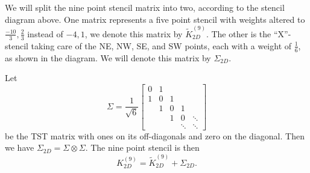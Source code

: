 We will split the nine point stencil matrix into two, according to the stencil diagram above.
One matrix represents a five point stencil with weights altered to $\frac{-10}{3}, \frac23$ instead of $-4, 1$, we denote this matrix by $\tilde{K}_{2D}^{(9)}$.
The other is the ``X''-stencil taking care of the NE, NW, SE, and SW points, each with a weight of $\frac16$, as shown in the diagram.
We will denote this matrix by $\Sigma_{2D}$.

Let
\begin{equation}
  \Sigma =
  \frac{1}{\sqrt{6}}
  \begin{bmatrix}
    0 & 1  \\
    1 & 0 & 1 \\
      & 1 & 0 & 1 \\
      &   & 1 & 0 & \ddots\\
      &   &   & \ddots  & \ddots
  \end{bmatrix}
\end{equation}
be the TST matrix with ones on its off-diagonals and zero on the diagonal.
Then we have $\Sigma_{2D} = \Sigma \otimes \Sigma$.
The nine point stencil is then
\begin{equation}
  K_{2D}^{(9)} = \tilde{K}_{2D}^{(9)} + \Sigma_{2D}.
\end{equation}

